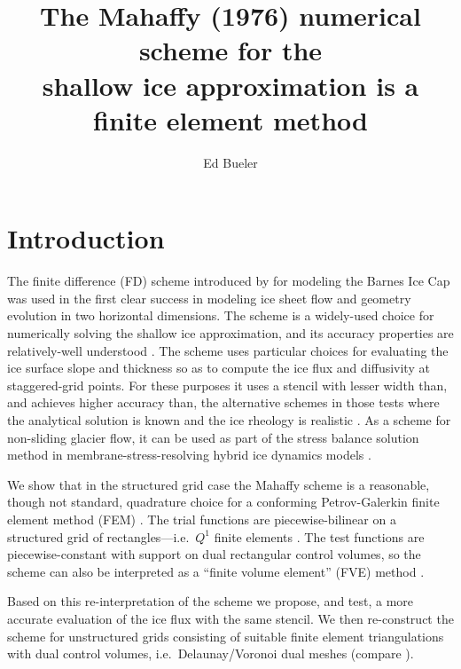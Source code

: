 \documentclass[11pt]{amsart}
\title[The Mahaffy scheme is a finite element method]{The Mahaffy (1976) numerical scheme for the \\ shallow ice approximation is a finite element method}
\author{Ed Bueler}
\begin{document}

\maketitle

\thispagestyle{empty}


\section{Introduction}

The finite difference (FD) scheme introduced by \cite{Mahaffy1976} for modeling the Barnes Ice Cap was used in the first clear success in modeling ice sheet flow and geometry evolution in two horizontal dimensions.  The scheme is a widely-used choice for numerically solving the shallow ice approximation, and its accuracy properties are relatively-well understood \cite{Bueleretal2005}.  The scheme uses particular choices for evaluating the ice surface slope and thickness so as to compute the ice flux and diffusivity at staggered-grid points.  For these purposes it uses a stencil with lesser width than, and achieves higher accuracy than, the alternative schemes in those tests where the analytical solution is known and the ice rheology is realistic \cite{HindmarshPayne1996}.  As a scheme for non-sliding glacier flow, it can be used as part of the stress balance solution method in membrane-stress-resolving hybrid ice dynamics models \cite{BuelerBrown2009}.

We show that in the structured grid case the Mahaffy scheme is a reasonable, though not standard, quadrature choice for a conforming Petrov-Galerkin finite element method (FEM) \cite{Elmanetal2005}.  The trial functions are piecewise-bilinear on a structured grid of rectangles---i.e.~$Q^1$ finite elements \cite{Elmanetal2005}.  The test functions are piecewise-constant with support on dual rectangular control volumes, so the scheme can also be interpreted as a ``finite volume element'' (FVE) method \cite{EwingLinLin2002}.

Based on this re-interpretation of the scheme we propose, and test, a more accurate evaluation of the ice flux with the same stencil.  We then re-construct the scheme for unstructured grids consisting of suitable finite element triangulations with dual control volumes, i.e.~Delaunay/Voronoi dual meshes (compare \cite{Ringleretal2013}).
\end{document}
